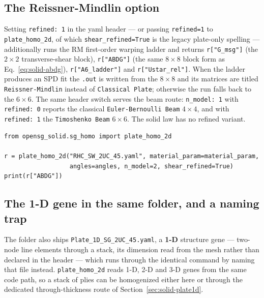 \subsection{The Reissner-Mindlin option}

Setting \texttt{refined: 1} in the yaml header --- or passing
\texttt{refined=1} to \texttt{plate\_homo\_2d}, of which
\texttt{shear\_refined=True} is the legacy plate-only spelling --- additionally
runs the RM first-order warping ladder and returns \texttt{r["G\_msg"]} (the
$2\times2$ transverse-shear block), \texttt{r["ABDG"]} (the same $8\times8$
block form as Eq.~\eqref{eq:solid-abdg}), \texttt{r["A6\_ladder"]} and
\texttt{r["Ustar\_rel"]}. When the ladder produces an SPD fit the \texttt{.out}
is written from the $8\times8$ and its matrices are titled
\texttt{Reissner-Mindlin} instead of \texttt{Classical Plate}; otherwise
the run falls back to the $6\times6$. The same header switch serves the beam
route: \texttt{n\_model: 1} with \texttt{refined: 0} reports the classical
\texttt{Euler-Bernoulli Beam} $4\times4$, and with \texttt{refined: 1} the
\texttt{Timoshenko Beam} $6\times6$. The solid law has no refined variant.

\begin{lstlisting}[style=opensg,caption={Requesting the 8x8 from a 2-D cell SG.}]
from opensg_solid.sg_homo import plate_homo_2d

r = plate_homo_2d("RHC_SW_2UC_45.yaml", material_param=material_param,
                  angles=angles, n_model=2, shear_refined=True)
print(r["ABDG"])
\end{lstlisting}

\subsection{The 1-D gene in the same folder, and a naming trap}

The folder also ships \texttt{Plate\_1D\_SG\_2UC\_45.yaml}, a \textbf{1-D}
structure gene --- two-node line elements through a stack, its dimension read
from the mesh rather than declared in the header --- which runs through the
identical command by naming that file instead.
\texttt{plate\_homo\_2d} reads 1-D, 2-D and 3-D genes from the same code path,
so a stack of plies can be homogenized either here or through the dedicated
through-thickness route of Section~\ref{sec:solid-plate1d}.

